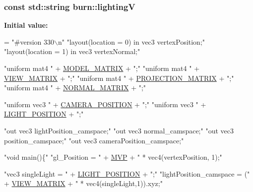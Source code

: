 \hypertarget{namespaceburn_a78bde68a8e56b05d88971530a815c479}{
\subsubsection[{lighting\-V}]{\setlength{\rightskip}{0pt plus 5cm}const std\-::string burn\-::lighting\-V}}\label{namespaceburn_a78bde68a8e56b05d88971530a815c479}
{\bfseries Initial value\-:}
\begin{DoxyCode}
= \textcolor{stringliteral}{"#version 330\(\backslash\)n"}
        \textcolor{stringliteral}{"layout(location = 0) in vec3 vertexPosition;"}
        \textcolor{stringliteral}{"layout(location = 1) in vec3 vertexNormal;"}

        \textcolor{stringliteral}{"uniform mat4 "} + \hyperlink{namespaceburn_aef2bc91c4c84fa143da611ee2f284c8b}{MODEL\_MATRIX} + \textcolor{stringliteral}{";"}
        \textcolor{stringliteral}{"uniform mat4 "} + \hyperlink{namespaceburn_a7cb7c6572d4f7796ea3e5edae85e51f1}{VIEW\_MATRIX} + \textcolor{stringliteral}{";"}
        \textcolor{stringliteral}{"uniform mat4 "} + \hyperlink{namespaceburn_ae5e90743826abef0fbc9d54704ae2a6f}{PROJECTION\_MATRIX} + \textcolor{stringliteral}{";"}
        \textcolor{stringliteral}{"uniform mat4 "} + \hyperlink{namespaceburn_a4daeaa4edb8bd22d9f48786640972b3a}{NORMAL\_MATRIX} + \textcolor{stringliteral}{";"}

        \textcolor{stringliteral}{"uniform vec3 "} + \hyperlink{namespaceburn_aea213969ba83f20b14023eac83ce7f04}{CAMERA\_POSITION} + \textcolor{stringliteral}{";"}
        \textcolor{stringliteral}{"uniform vec3 "} + \hyperlink{namespaceburn_a6512046548178a3d2212bfbca815c5b0}{LIGHT\_POSITION} + \textcolor{stringliteral}{";"}

        \textcolor{stringliteral}{"out vec3 lightPosition\_camspace;"}
        \textcolor{stringliteral}{"out vec3 normal\_camspace;"}
        \textcolor{stringliteral}{"out vec3 position\_camspace;"}
        \textcolor{stringliteral}{"out vec3 cameraPosition\_camspace;"}

        \textcolor{stringliteral}{"void main()\{"}
            \textcolor{stringliteral}{"gl\_Position = "} + \hyperlink{namespaceburn_a7c71b053f299e14c880f0f11ba916a44}{MVP} + \textcolor{stringliteral}{" * vec4(vertexPosition, 1);"}

            \textcolor{stringliteral}{"vec3 singleLight = "} + \hyperlink{namespaceburn_a6512046548178a3d2212bfbca815c5b0}{LIGHT\_POSITION} + \textcolor{stringliteral}{";"}
            \textcolor{stringliteral}{"lightPosition\_camspace = ("} + \hyperlink{namespaceburn_a7cb7c6572d4f7796ea3e5edae85e51f1}{VIEW\_MATRIX} + \textcolor{stringliteral}{" * vec4(singleLight,1)).xyz;"}


\end{DoxyCode}
